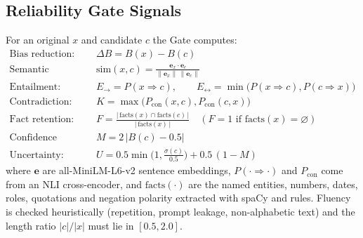 \documentclass[12pt,a4paper,oneside]{report}
\begin{document}
\subsection{Reliability Gate Signals}
For an original $x$ and candidate $c$ the Gate computes:
\begin{align}
\text{Bias reduction:}\quad & \Delta B = B(x)-B(c)\\
\text{Semantic similarity:}\quad & \text{sim}(x,c)=\frac{\mathbf{e}_x\cdot\mathbf{e}_c}{\lVert\mathbf{e}_x\rVert\,\lVert\mathbf{e}_c\rVert}\\
\text{Entailment:}\quad & E_{\rightarrow}=P(x\Rightarrow c),\qquad E_{\leftrightarrow}=\min\big(P(x\Rightarrow c),P(c\Rightarrow x)\big)\\
\text{Contradiction:}\quad & K=\max\big(P_{\text{con}}(x,c),P_{\text{con}}(c,x)\big)\\
\text{Fact retention:}\quad & F=\frac{|\,\text{facts}(x)\cap\text{facts}(c)\,|}{|\,\text{facts}(x)\,|}\quad(F=1\text{ if facts}(x)=\varnothing)\\
\text{Confidence margin:}\quad & M=2\,|B(c)-0.5|\\
\text{Uncertainty:}\quad & U=0.5\min\!\Big(1,\frac{\sigma(c)}{0.5}\Big)+0.5\,(1-M)
\end{align}
where $\mathbf{e}$ are all-MiniLM-L6-v2 sentence embeddings, $P(\cdot\Rightarrow\cdot)$ and $P_{\text{con}}$ come from
an NLI cross-encoder, and $\text{facts}(\cdot)$ are the named entities, numbers, dates, roles, quotations and negation
polarity extracted with spaCy and rules. Fluency is checked heuristically (repetition, prompt leakage, non-alphabetic
text) and the length ratio $|c|/|x|$ must lie in $[0.5,2.0]$.
\end{document}
